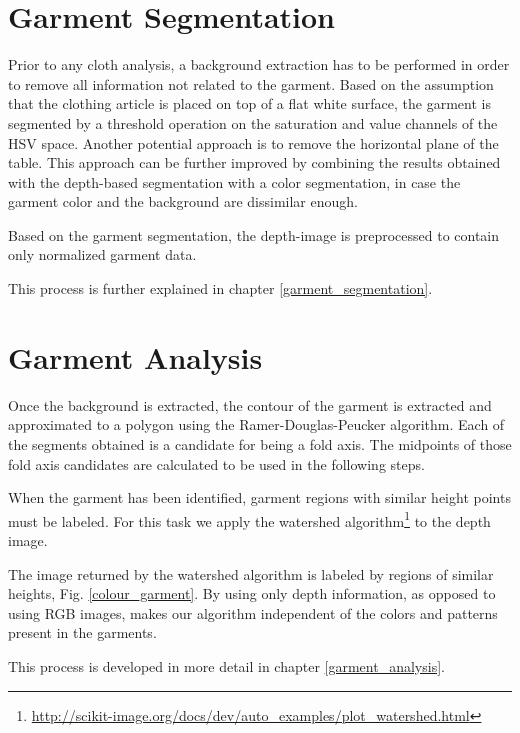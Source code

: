 \section{Garment Segmentation}
Prior to any cloth analysis, a background extraction has to be performed in order to remove all information not related to the garment.
Based on the assumption that the clothing article is placed on top of a flat white surface, the garment is segmented by a threshold operation on the saturation and value channels of the HSV space. Another potential approach is to remove the horizontal plane of the table. This approach can be further improved by combining the results obtained with the depth-based segmentation with a color segmentation, in case the garment color and the background are dissimilar enough.

Based on the garment segmentation, the depth-image is preprocessed to contain only normalized garment data.

This process is further explained in chapter \ref{garment_segmentation}.

\section{Garment Analysis}
Once the background is extracted, the contour of the garment is extracted and approximated to a polygon using the Ramer-Douglas-Peucker algorithm. Each of the segments obtained is a candidate for being a fold axis. The midpoints of those fold axis candidates are calculated to be used in the following steps.

When the garment has been identified, garment regions with similar height points must be labeled. For this task we apply the watershed algorithm\footnote{\url{http://scikit-image.org/docs/dev/auto_examples/plot_watershed.html}}  to the depth image. 

 

The image returned by the watershed algorithm is labeled by regions of similar heights, Fig. \ref{colour_garment}. By using only depth information, as opposed to using RGB images, makes our algorithm independent of the colors and patterns present in the garments.

This process is developed in more detail in chapter \ref{garment_analysis}.

